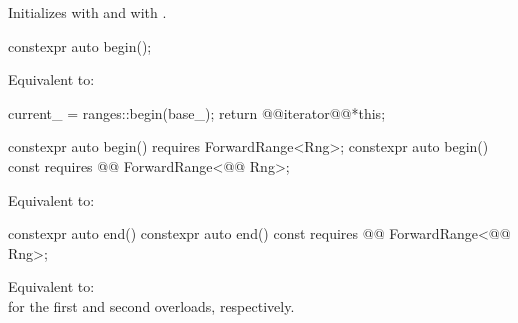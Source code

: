 \begin{itemdescr}
\pnum
\effects
{\color{newclr}
Initializes  with  and
 with .
} %

\end{itemdescr}

%
\begin{itemdecl}
constexpr auto begin();
\end{itemdecl}

\begin{itemdescr}
\pnum
\effects Equivalent to:
\begin{codeblock}
current_ = ranges::begin(base_);
return @@iterator@@{*this};
\end{codeblock}
\end{itemdescr}

%
\begin{itemdecl}
constexpr auto begin() requires ForwardRange<Rng>;
constexpr auto begin() const
  requires @@ ForwardRange<@@ Rng>;
\end{itemdecl}

\begin{itemdescr}
\pnum
\effects Equivalent to:
 \\
\end{itemdescr}

%
\begin{itemdecl}
constexpr auto end()
constexpr auto end() const
  requires @@ ForwardRange<@@ Rng>;
\end{itemdecl}

\begin{itemdescr}
\pnum
\effects Equivalent to:
 \\
for the first and second overloads, respectively.
\end{itemdescr}

